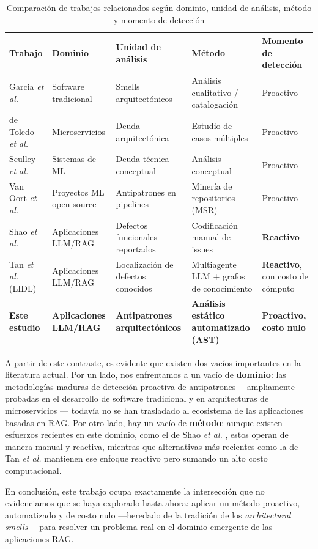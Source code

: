 \begin{table}[t]
\centering
\caption{Comparación de trabajos relacionados según dominio, unidad de análisis, método y momento de detección}
\label{tab:related_work}
\begin{tabular}{@{}p{2.4cm}p{2.3cm}p{2.9cm}p{3.0cm}p{3.4cm}@{}}
\toprule
\textbf{Trabajo} & \textbf{Dominio} & \textbf{Unidad de análisis} & \textbf{Método} & \textbf{Momento de detección} \\
\midrule
Garcia \textit{et al.} \cite{garcia_identifying_2009} & Software tradicional & Smells arquitectónicos & Análisis cualitativo / catalogación & Proactivo \\
de Toledo \textit{et al.} \cite{de_toledo_identifying_2021} & Microservicios & Deuda arquitectónica & Estudio de casos múltiples & Proactivo \\
Sculley \textit{et al.} \cite{sculley_hidden_2015} & Sistemas de ML & Deuda técnica conceptual & Análisis conceptual & Proactivo \\
Van Oort \textit{et al.} \cite{oort_prevalence_2021} & Proyectos ML open-source & Antipatrones en pipelines & Minería de repositorios (MSR) & Proactivo \\
Shao \textit{et al.} \cite{shao_are_2024} & Aplicaciones LLM/RAG & Defectos funcionales reportados & Codificación manual de issues & \textbf{Reactivo} \\
Tan \textit{et al.} (LIDL) \cite{tan_lidl_2026} & Aplicaciones LLM/RAG & Localización de defectos conocidos & Multiagente LLM + grafos de conocimiento & \textbf{Reactivo}, con costo de cómputo \\
\textbf{Este estudio} & \textbf{Aplicaciones LLM/RAG} & \textbf{Antipatrones arquitectónicos} & \textbf{Análisis estático automatizado (AST)} & \textbf{Proactivo, costo nulo} \\
\bottomrule
\end{tabular}
\end{table}
 
A partir de este contraste, es evidente que existen dos vacíos importantes en la literatura actual. Por un lado, nos enfrentamos a un vacío de \textbf{dominio}: las metodologías maduras de detección proactiva de antipatrones —ampliamente probadas en el desarrollo de software tradicional \cite{garcia_identifying_2009,fontana_arcan_2017} y en arquitecturas de microservicios \cite{de_toledo_identifying_2021,pigazzini_towards_2020}— todavía no se han trasladado al ecosistema de las aplicaciones basadas en RAG. Por otro lado, hay un vacío de \textbf{método}: aunque existen esfuerzos recientes en este dominio, como el de Shao \textit{et al.} \cite{shao_are_2024}, estos operan de manera manual y reactiva, mientras que alternativas más recientes como la de Tan \textit{et al.} \cite{tan_lidl_2026} mantienen ese enfoque reactivo pero sumando un alto costo computacional. 

En conclusión, este trabajo ocupa exactamente la intersección que no evidenciamos que se haya explorado hasta ahora: aplicar un método proactivo, automatizado y de costo nulo —heredado de la tradición de los \textit{architectural smells}— para resolver un problema real en el dominio emergente de las aplicaciones RAG.